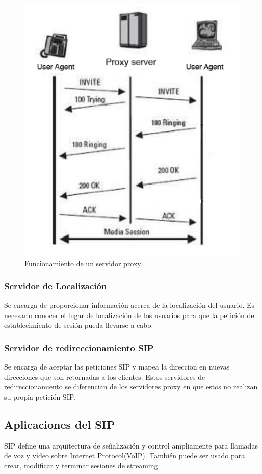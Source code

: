 \documentclass[a4paper, 11pt]{article} %
\begin{document}
		\begin{figure}[tbph]
			\centering
			\includegraphics[width=0.7\linewidth]{./Sproxy}
			\caption{Funcionamiento de un servidor proxy}
			\label{fig:Sproxy}
		\end{figure}
		
		\subsubsection{Servidor de Localización}
			Se encarga de proporcionar información acerca de la localización del usuario. Es necesario conocer el lugar de localización de los usuarios para que la petición de establecimiento de sesión pueda llevarse a cabo.
		
		\subsubsection{Servidor de redireccionamiento SIP}
			Se encarga de aceptar las peticiones SIP y mapea la direccion en nuevas direcciones que son retornadas a los clientes. Estos servidores de redireccionamiento se diferencian  de los servidores proxy en que estos no realizan su propia petición SIP.
	
	\subsection{Aplicaciones del SIP}
		SIP define una arquitectura de señalización y control ampliamente para llamadas de voz y vídeo sobre Internet Protocol(VoIP). También puede ser usado para crear, modificar y terminar sesiones de streaming.
		
\end{document}
